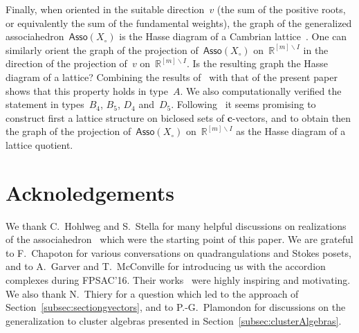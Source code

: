 \documentclass{amsart}
\theoremstyle{definition}
\newcommand{\R}{\mathbb{R}} %
\newcommand{\cA}{\mathcal{A}} %
\renewcommand{\b}[1]{\mathbf{#1}} %
\newcommand{\set}[2]{\left\{ #1 \;\middle|\; #2 \right\}} %
\newcommand{\ssm}{\smallsetminus} %
\newcommand{\Asso}{\mathsf{Asso}} %
\newcommand{\gvectorFan}{\mathcal{F}^\mathbf{g}} %
\newcommand{\restrictedComplex}[3]{\Delta^{\b{#1}}(#2,#3)} %
\begin{document}

Finally, when oriented in the suitable direction~$v$ (the sum of the positive roots, or equivalently the sum of the fundamental weights), the graph of the generalized associahedron~$\Asso(X_\circ)$ is the Hasse diagram of a Cambrian lattice~\cite{Reading-CambrianLattices}. One can similarly orient the graph of the projection of~$\Asso(X_\circ)$ on~$\R^{[m] \ssm I}$ in the direction of the projection of~$v$ on~$\R^{[m] \ssm I}$. Is the resulting graph the Hasse diagram of a lattice? Combining the results of~\cite{GarverMcConville} with that of the present paper shows that this property holds in type~$A$. We also computationally verified the statement in types~$B_4$, $B_5$, $D_4$ and~$D_5$. Following~\cite{GarverMcConville} it seems promising to construct first a lattice structure on biclosed sets of $\b{c}$-vectors, and to obtain then the graph of the projection of~$\Asso(X_\circ)$ on~$\R^{[m] \ssm I}$ as the Hasse diagram of a lattice quotient.


\section*{Acknoledgements}

We thank C.~Hohlweg and S.~Stella for many helpful discussions on realizations of the associahedron~\cite{HohlwegPilaudStella} which were the starting point of this paper. We are grateful to F.~Chapoton for various conversations on quadrangulations and Stokes posets, and to A.~Garver and \mbox{T.~McConville} for introducing us with the accordion complexes during FPSAC'16. Their works~\cite{Chapoton-quadrangulations, GarverMcConville} were highly inspiring and motivating. We also thank N.~Thiery for a question which led to the approach of Section~\ref{subsec:sectiongvectors}, and to P.-G.~Plamondon for discussions on the generalization to cluster algebras presented in Section~\ref{subsec:clusterAlgebras}.




\label{sec:biblio}
\end{document}
